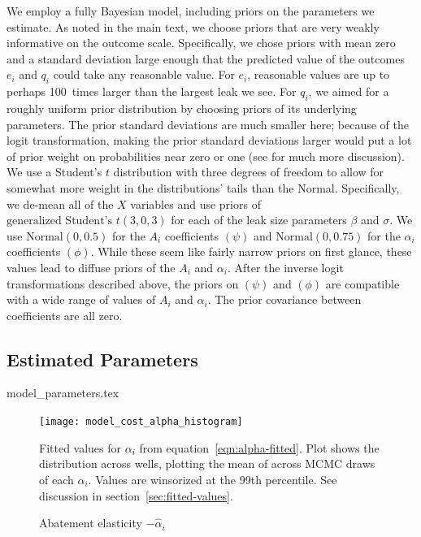 \documentclass[12pt,oneside,letterpaper]{article}
\theoremstyle{definition}
\begin{document}
\begin{refsection}
We employ a fully Bayesian model, including priors on the parameters we estimate.
As noted in the main text, we choose priors that are very weakly informative on the outcome scale.
Specifically, we chose priors with mean zero and a standard deviation large enough that the predicted value of the outcomes \(e_i\) and \(q_i\) could take any reasonable value.
For \(e_i\), reasonable values are up to perhaps 100~times larger than the largest leak we see.
For \(q_i\), we aimed for a roughly uniform prior distribution by choosing priors of its underlying parameters.
The prior standard deviations are much smaller here;
because of the logit transformation, making the prior standard deviations larger would put a lot of prior weight on probabilities near zero or one
(see \cite{Gelman/etal:2020} for much more discussion).
We use a Student's \(t\) distribution with three degrees of freedom to allow for somewhat more weight in the distributions' tails than the Normal.
Specifically, we de-mean all of the \(X\) variables and use priors of
\(\text{generalized Student's } t(3, 0, 3)\) for each of the leak size parameters \(\beta\) and \(\sigma\).
We use \(\text{Normal}(0, 0.5)\) for the \(A_i\) coefficients \((\psi)\) and
\(\text{Normal}(0, 0.75)\) for the \(\alpha_i\) coefficients \((\phi)\).
While these seem like fairly narrow priors on first glance, these values lead to diffuse priors of the \(A_i\) and \(\alpha_i\).
After the inverse logit transformations described above, the priors on \((\psi)\) and \((\phi)\) are compatible with a wide range of values of  \(A_i\) and \(\alpha_i\).
The prior covariance between coefficients are all zero.

\subsection{Estimated Parameters}
\begin{table}[!bthp] %
\vspace*{-0.5\baselineskip}
\centering
{model_parameters.tex}
\end{table}


\begin{figure}[!bthp]
  \caption{Abatement elasticity \(-\hat{\alpha}_i\)}
  \label{fig:histogram-alphas}
  \texttt{[image: model\_cost\_alpha\_histogram]}

Fitted values for \(\alpha_i\) from equation~\ref{eqn:alpha-fitted}.
Plot shows the distribution across wells, plotting the mean of across \gls{MCMC} draws of each \(\hat{\alpha_i}\).
Values are winsorized at the 99th percentile.
See discussion in section~\ref{sec:fitted-values}.
\end{figure}




\end{refsection}
\end{document}
